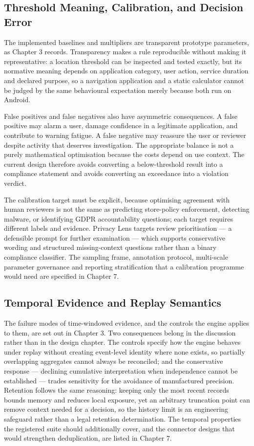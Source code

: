 \subsection{Threshold Meaning, Calibration, and Decision Error}

The implemented baselines and multipliers are transparent prototype parameters, as Chapter 3 records. Transparency makes a rule reproducible without making it representative: a location threshold can be inspected and tested exactly, but its normative meaning depends on application category, user action, service duration and declared purpose, so a navigation application and a static calculator cannot be judged by the same behavioural expectation merely because both run on Android.

False positives and false negatives also have asymmetric consequences. A false positive may alarm a user, damage confidence in a legitimate application, and contribute to warning fatigue. A false negative may reassure the user or reviewer despite activity that deserves investigation. The appropriate balance is not a purely mathematical optimisation because the costs depend on use context. The current design therefore avoids converting a below-threshold result into a compliance statement and avoids converting an exceedance into a violation verdict.

The calibration target must be explicit, because optimising agreement with human reviewers is not the same as predicting store-policy enforcement, detecting malware, or identifying GDPR accountability questions; each target requires different labels and evidence. Privacy Lens targets review prioritisation — a defensible prompt for further examination — which supports conservative wording and structured missing-context questions rather than a binary compliance classifier. The sampling frame, annotation protocol, multi-scale parameter governance and reporting stratification that a calibration programme would need are specified in Chapter 7.

\subsection{Temporal Evidence and Replay Semantics}

The failure modes of time-windowed evidence, and the controls the engine applies to them, are set out in Chapter 3. Two consequences belong in the discussion rather than in the design chapter. The controls specify how the engine behaves under replay without creating event-level identity where none exists, so partially overlapping aggregates cannot always be reconciled; and the conservative response — declining cumulative interpretation when independence cannot be established — trades sensitivity for the avoidance of manufactured precision. Retention follows the same reasoning: keeping only the most recent records bounds memory and reduces local exposure, yet an arbitrary truncation point can remove context needed for a decision, so the history limit is an engineering safeguard rather than a legal retention determination. The temporal properties the registered suite should additionally cover, and the connector designs that would strengthen deduplication, are listed in Chapter 7.

